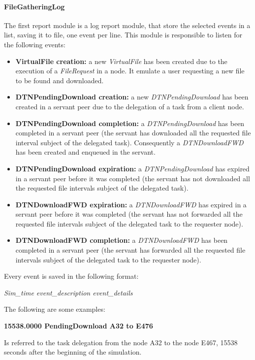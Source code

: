 \paragraph{FileGatheringLog}
The first report module is a log report module, that store the selected events in a list, saving it to file, one event per line. This module is responsible to listen for the following events:
\begin{itemize}
\item \textbf{VirtualFile creation:} a new \textit{VirtualFile} has been created due to the execution of a \textit{FileRequest} in a node. It emulate a user requesting a new file to be found and downloaded.
\item \textbf{DTNPendingDownload creation:} a new \textit{DTNPendingDownload} has been created in a servant peer due to the delegation of a task from a client node.
\item \textbf{DTNPendingDownload completion:} a \textit{DTNPendingDownload} has been completed in a servant peer (the servant has downloaded all the requested file interval subject of the delegated task). Consequently a \textit{DTNDownloadFWD} has been created and enqueued in the servant.
\item \textbf{DTNPendingDownload expiration:} a \textit{DTNPendingDownload} has expired in a servant peer before it was completed (the servant has not downloaded all the requested file intervals subject of the delegated task).
\item \textbf{DTNDownloadFWD expiration:} a \textit{DTNDownloadFWD} has expired in a servant peer before it was completed (the servant has not forwarded all the requested file intervals subject of the delegated task to the requester node).
\item \textbf{DTNDownloadFWD completion:} a \textit{DTNDownloadFWD} has been completed in a servant peer (the servant has forwarded all the requested file intervals subject of the delegated task to the requester node).
\end{itemize}

Every event is saved in the following format:
\begin{center}
\textit{Sim\_time	event\_description	event\_details}
\end{center}
The following are some examples:

\begin{center}
\textbf{15538.0000	PendingDownload	A32 to E476}
\end{center}
Is referred to the task delegation from the node A32 to the node E467, 15538 seconds after the beginning of the simulation.
\\

